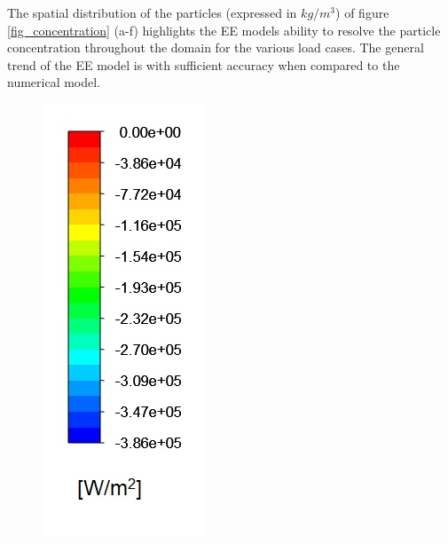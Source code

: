 \documentclass{webofc}
\begin{document}
The spatial distribution of the particles (expressed in $kg/m^3$) of figure \ref{fig_concentration} (a-f) highlights the EE models ability to resolve the particle concentration throughout the domain for the various load cases. The general trend of the EE model is with sufficient accuracy when compared to the numerical model.\\
\begin{figure}[h!]
\centering
\includegraphics[scale = 0.3]{wall_heat}
\hspace{2mm}

\end{figure}
\end{document}
